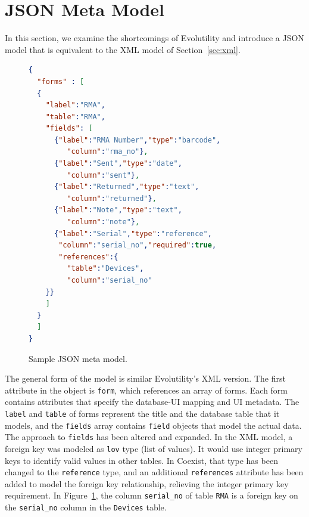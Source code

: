 \documentclass[journal]{IEEEtran}
\begin{document}
\section{JSON Meta Model} \label{sec:json}

In this section, we examine the shortcomings of Evolutility and introduce a JSON model that is equivalent to the XML model of Section~\ref{sec:xml}. 



\begin{figure}[h!]
\begin{lstlisting}[language=json]
{
  "forms" : [
  {
    "label":"RMA",
    "table":"RMA",
    "fields": [
      {"label":"RMA Number","type":"barcode",
         "column":"rma_no"},
      {"label":"Sent","type":"date",
         "column":"sent"},
      {"label":"Returned","type":"text",
         "column":"returned"},
      {"label":"Note","type":"text",
         "column":"note"},
      {"label":"Serial","type":"reference",
       "column":"serial_no","required":true,
       "references":{
         "table":"Devices",
         "column":"serial_no"
    }}
    ]
  }
  ]
}
\end{lstlisting}
\caption{Sample JSON meta model.}
\label{fig:json_sample}
\end{figure}

The general form of the model is similar Evolutility's XML version. The first attribute in the object is \texttt{form}, which references an array of forms. Each form contains attributes that specify the database-UI mapping and UI metadata. The \texttt{label} and \texttt{table} of forms represent the title and the database table that it models, and the \texttt{fields} array contains \texttt{field} objects that model the actual data. The approach to \texttt{fields} has been altered and expanded. In the XML model, a foreign key was modeled as \texttt{lov} type (list of values). It would use integer primary keys to identify valid values in other tables. In Coexist, that type has been changed to the \texttt{reference} type, and an additional \texttt{references} attribute has been added to model the foreign key relationship, relieving the integer primary key requirement. In Figure~\ref{fig:json_sample}, the column \texttt{serial\_no} of table \texttt{RMA} is a foreign key on the \texttt{serial\_no} column in the \texttt{Devices} table. 
\end{document}
